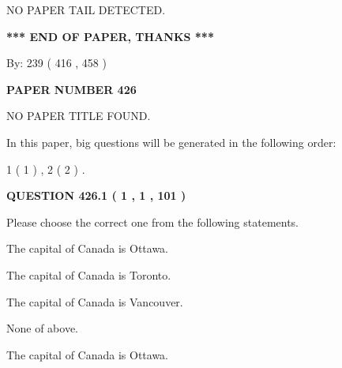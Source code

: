 \documentclass[12pt]{article}
\begin{document}
   
   
   
\vspace{2.0in} NO PAPER TAIL DETECTED.
   
   
   
   
\vspace{1.0in} 
{\textbf{\large{ *** END OF PAPER, THANKS *** }}} 
   
   
\hspace{1.0in} By: 
 239 ( 416 ,  458 )
   
   
   
   
\newpage 
\setcounter{page}{ 
   426001 } 
   
   
   
   
 {\textbf{ \Large{ PAPER NUMBER  426  }}}
   
   
\vspace{0.2in}
   
   
   
   
   
   
 NO PAPER TITLE FOUND.
   
   
   
\vspace{0.2in}
   
In this paper, big questions will be generated in the following order: 
   
   
   1 ( 1 )
 ,
   2 ( 2 )
 .
  
\vspace{0.2in}
  
{\textbf{\Large{QUESTION
426.1 
 ( 1 , 1 , 101 )
}}}
  
  
Please choose the correct one from the following statements.
 
 
The capital of Canada is Ottawa.
 
 
The capital of Canada is Toronto.
 
 
The capital of Canada is Vancouver.
 
 
 None of above.
 
 
\noindent{}
 
 
The capital of Canada is Ottawa.
 
 
\noindent{}
 
\end{document}
